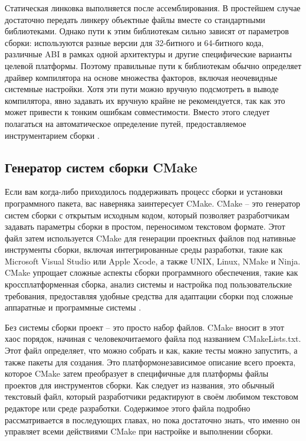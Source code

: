 Статическая линковка выполняется после ассемблирования. В простейшем случае достаточно передать линкеру объектные файлы вместе со стандартными библиотеками. Однако пути к этим библиотекам сильно зависят от параметров сборки: используются разные версии для 32-битного и 64-битного кода, различные ABI в рамках одной архитектуры и другие специфические варианты целевой платформы. Поэтому правильные пути к библиотекам обычно определяет драйвер компилятора на основе множества факторов, включая неочевидные системные настройки. Хотя эти пути можно вручную подсмотреть в выводе компилятора, явно задавать их вручную крайне не рекомендуется, так как это может привести к тонким ошибкам совместимости. Вместо этого следует полагаться на автоматическое определение путей, предоставляемое инструментарием сборки \cite{Vladimirov2024}.

\subsection{Генератор систем сборки CMake}

Если вам когда-либо приходилось поддерживать процесс сборки и установки программного пакета, вас наверняка заинтересует CMake. CMake -- это генератор систем сборки с открытым исходным кодом, который позволяет разработчикам задавать параметры сборки в простом, переносимом текстовом формате. Этот файл затем используется CMake для генерации проектных файлов под нативные инструменты сборки, включая интегрированные среды разработки, такие как Microsoft Visual Studio или Apple Xcode, а также UNIX, Linux, NMake и Ninja. CMake упрощает сложные аспекты сборки программного обеспечения, такие как кроссплатформенная сборка, анализ системы и настройка под пользовательские требования, предоставляя удобные средства для адаптации сборки под сложные аппаратные и программные системы \cite{CMake}.

Без системы сборки проект -- это просто набор файлов. CMake вносит в этот хаос порядок, начиная с человекочитаемого файла под названием CMakeLists.txt. Этот файл определяет, что можно собрать и как, какие тесты можно запустить, а также пакеты для создания. Это платформонезависимое описание всего проекта, которое CMake затем преобразует в специфичные для платформы файлы проектов для инструментов сборки. Как следует из названия, это обычный текстовый файл, который разработчики редактируют в своём любимом текстовом редакторе или среде разработки. Содержимое этого файла подробно рассматривается в последующих главах, но пока достаточно знать, что именно он управляет всеми действиями CMake при настройке и выполнении сборки.

